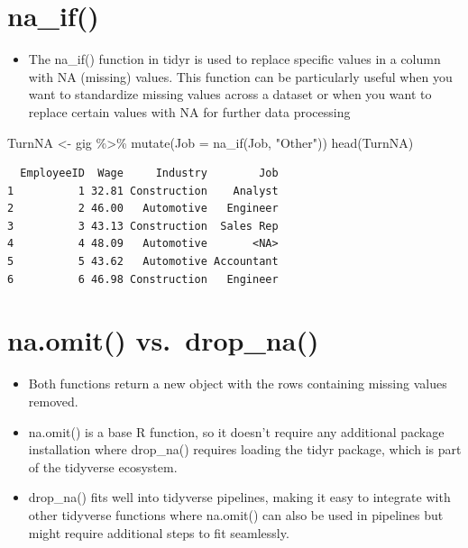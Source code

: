 \documentclass[
  letterpaper,
  DIV=11,
  numbers=noendperiod]{scrreprt}
\newenvironment{Shaded}{\begin{snugshade}}{\end{snugshade}}
\newcommand{\AttributeTok}[1]{\textcolor[rgb]{0.40,0.45,0.13}{#1}}
\newcommand{\FunctionTok}[1]{\textcolor[rgb]{0.28,0.35,0.67}{#1}}
\newcommand{\NormalTok}[1]{\textcolor[rgb]{0.00,0.23,0.31}{#1}}
\newcommand{\OtherTok}[1]{\textcolor[rgb]{0.00,0.23,0.31}{#1}}
\newcommand{\SpecialCharTok}[1]{\textcolor[rgb]{0.37,0.37,0.37}{#1}}
\newcommand{\StringTok}[1]{\textcolor[rgb]{0.13,0.47,0.30}{#1}}
\providecommand{\tightlist}{%
  \setlength{\itemsep}{0pt}\setlength{\parskip}{0pt}}\usepackage{longtable,booktabs,array}
\begin{document}
\section{na\_if()}\label{na_if}

\begin{itemize}
\tightlist
\item
  The na\_if() function in tidyr is used to replace specific values in a
  column with NA (missing) values. This function can be particularly
  useful when you want to standardize missing values across a dataset or
  when you want to replace certain values with NA for further data
  processing
\end{itemize}

\begin{Shaded}
\begin{Highlighting}[]
\NormalTok{TurnNA }\OtherTok{\textless{}{-}}\NormalTok{ gig }\SpecialCharTok{\%\textgreater{}\%}
    \FunctionTok{mutate}\NormalTok{(}\AttributeTok{Job =} \FunctionTok{na\_if}\NormalTok{(Job, }\StringTok{"Other"}\NormalTok{))}
\FunctionTok{head}\NormalTok{(TurnNA)}
\end{Highlighting}
\end{Shaded}

\begin{verbatim}
  EmployeeID  Wage     Industry        Job
1          1 32.81 Construction    Analyst
2          2 46.00   Automotive   Engineer
3          3 43.13 Construction  Sales Rep
4          4 48.09   Automotive       <NA>
5          5 43.62   Automotive Accountant
6          6 46.98 Construction   Engineer
\end{verbatim}

\section{na.omit() vs.~drop\_na()}\label{na.omit-vs.-drop_na}

\begin{itemize}
\item
  Both functions return a new object with the rows containing missing
  values removed.
\item
  na.omit() is a base R function, so it doesn't require any additional
  package installation where drop\_na() requires loading the tidyr
  package, which is part of the tidyverse ecosystem.
\item
  drop\_na() fits well into tidyverse pipelines, making it easy to
  integrate with other tidyverse functions where na.omit() can also be
  used in pipelines but might require additional steps to fit
  seamlessly.
\end{itemize}
\end{document}
